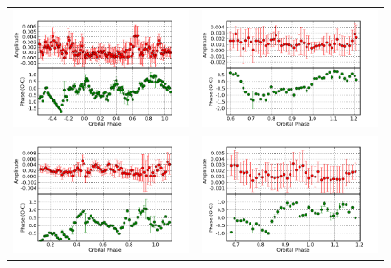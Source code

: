 \begin{figure}
\begin{narrow}{-1in}{0in}


\begin{tabular}{cc}
\includegraphics[width = 0.65\columnwidth, bb=0 0 600 400]{images/archive_phot/norm_int_eclipsing/S6544_23.13.png} &
\includegraphics[width = 0.65\columnwidth, bb=0 0 600 400]{images/archive_phot/norm_int_eclipsing/S6549_22.60.png} \\
\includegraphics[width = 0.65\columnwidth, bb=0 0 600 400]{images/archive_phot/norm_int_eclipsing/S6551d_22.66.png} &
\includegraphics[width = 0.65\columnwidth, bb=0 0 600 400]{images/archive_phot/norm_int_eclipsing/S6564d_22.68.png} \\

\end{tabular}
\end{narrow}
\end{figure}
